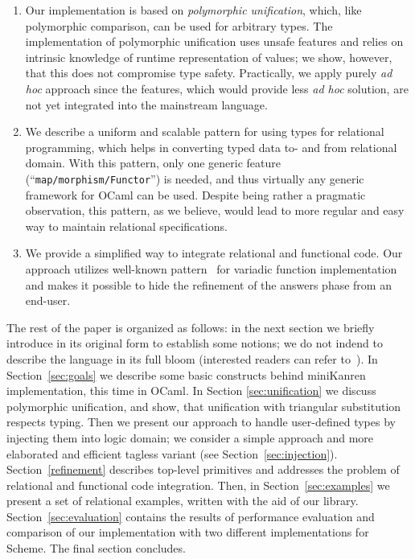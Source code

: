 \begin{enumerate}
\item Our implementation is based on \emph{polymorphic unification}, which, like polymorphic comparison,
can be used for arbitrary types. The implementation of polymorphic unification uses unsafe features and
relies on intrinsic knowledge of runtime representation of values; we show, however, that this does not
compromise type safety. Practically, we apply purely \emph{ad hoc} approach since the features, 
which would provide less \emph{ad hoc} solution, are not yet integrated into the mainstream language.

\item We describe a uniform and scalable pattern for using types for relational programming, which
helps in converting typed data to- and from relational domain. With this pattern, only one
generic feature (``\lstinline{map/morphism/Functor}'') is needed, and thus virtually any generic 
framework for OCaml can be used. Despite being rather a pragmatic observation, this pattern, as we
believe, would lead to  more regular and easy way to maintain relational specifications.

\item We provide a simplified way to integrate relational and functional code. Our approach utilizes
well-known pattern~\cite{Unparsing, DoWeNeed} for variadic function implementation and makes it
possible to hide the refinement of the answers phase from an end-user.
\end{enumerate}

The rest of the paper is organized as follows: in the next section we briefly introduce \miniKanren in
its original form to establish some notions; we do not indend to describe the language in its full bloom (interested readers can
refer to~\cite{TRS}). In Section~\ref{sec:goals} we describe some basic constructs behind miniKanren implementation, this time 
in OCaml. In Section \ref{sec:unification} we discuss polymorphic unification, and show, that unification with 
triangular substitution respects typing. Then we present our approach to handle user-defined types by injecting them 
into logic domain; we consider a simple approach and more elaborated and efficient tagless variant (see Section~\ref{sec:injection}). 
Section~\ref{refinement} describes top-level primitives and addresses the problem of relational and functional code integration. 
Then, in Section~\ref{sec:examples} we present a set of relational examples, written with the aid of our 
library. Section~\ref{sec:evaluation} contains the results of performance evaluation and comparison of our implementation 
with two different implementations for Scheme. The final section concludes.

